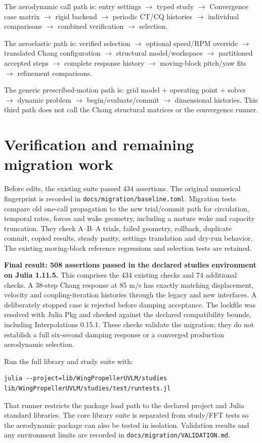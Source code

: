 \documentclass[11pt,a4paper]{article}
\newcommand{\code}{\nolinkurl}
\begin{document}
The aerodynamic call path is: entry settings $\to$ typed study $\to$
Convergence case matrix $\to$ rigid backend $\to$ periodic CT/CQ histories
$\to$ individual comparisons $\to$ combined verification $\to$ selection.

The aeroelastic path is: verified selection $\to$ optional speed/RPM override
$\to$ translated Chang configuration $\to$ structural model/workspace
$\to$ partitioned accepted steps $\to$ complete response history
$\to$ moving-block pitch/yaw fits $\to$ refinement comparisons.

The generic prescribed-motion path is: grid model + operating point + solver
$\to$ dynamic problem $\to$ begin/evaluate/commit $\to$ dimensional histories.
This third path does not call the Chang structural matrices or the convergence
runner.

\section{Verification and remaining migration work}

Before edits, the existing suite passed 434 assertions. The original numerical
fingerprint is recorded in \code{docs/migration/baseline.toml}. Migration tests
compare old one-call propagation to the new trial/commit path for circulation,
temporal rates, forces and wake geometry, including a mature wake and capacity
truncation. They check A--B--A trials, failed geometry, rollback, duplicate
commit, copied results, steady parity, settings translation and dry-run behavior.
The existing moving-block reference regressions and selection tests are retained.

\textbf{Final result: 508 assertions passed in the declared studies environment
on Julia 1.11.5.} This comprises the 434 existing checks and 74 additional checks.
A 38-step Chang response at 85 m/s has exactly matching displacement, velocity
and coupling-iteration histories through the legacy and new interfaces. A
deliberately stopped case is rejected before damping acceptance. The lockfile
was resolved with Julia Pkg and checked against the declared compatibility
bounds, including Interpolations 0.15.1. These checks validate the migration;
they do not establish a full six-second damping response or a converged
production aerodynamic selection.

Run the full library and study suite with:
\begin{lstlisting}
julia --project=lib/WingPropellerUVLM/studies lib/WingPropellerUVLM/studies/test/runtests.jl
\end{lstlisting}
That runner restricts the package load path to the declared project and Julia
standard libraries. The core library suite is separated from study/FFT tests
so the aerodynamic package can also be tested in isolation. Validation results
and any environment limits are recorded in \code{docs/migration/VALIDATION.md}.
\end{document}
